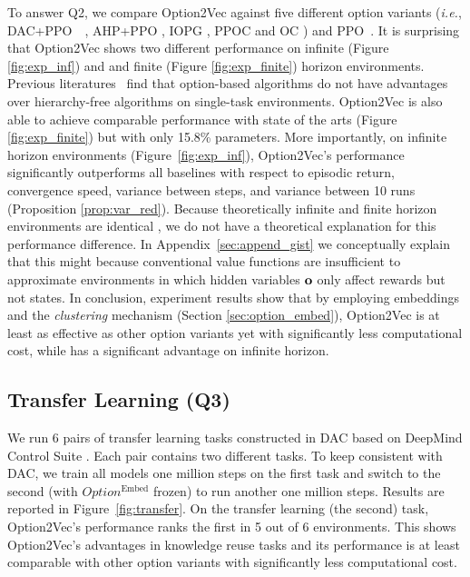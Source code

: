 \documentclass[10pt,journal,compsoc]{IEEEtran}
\renewcommand{\cite}{\citep}
\begin{document}
To answer Q2, we compare Option2Vec against five different option variants (\textit{i.e.}, DAC+PPO~~\cite{zhang2019dac}, AHP+PPO
\cite{levy2011unified}, IOPG \cite{smith2018inference}, PPOC
\cite{klissarov2017learnings} and OC \cite{bacon2017option}) and PPO~\cite{schulman2017proximal}. It is surprising that Option2Vec shows two different
performance on infinite (Figure \ref{fig:exp_inf}) and and finite
(Figure \ref{fig:exp_finite}) horizon environments. Previous
literatures~\cite{klissarov2017learnings,smith2018inference,harb2018waiting,zhang2019dac}
find that option-based algorithms do not have advantages over
hierarchy-free algorithms on single-task environments. Option2Vec
is also able to achieve comparable performance with state of the arts (Figure
\ref{fig:exp_finite}) but with only 15.8\% parameters.
More importantly, on infinite horizon environments
(Figure~\ref{fig:exp_inf}), Option2Vec's performance
significantly outperforms all baselines with respect to episodic
return, convergence speed, variance between steps, and variance
between 10 runs (Proposition \ref{prop:var_red}). Because
theoretically infinite and finite horizon environments are
identical \cite{sutton2018reinforcement}, we do not have a
theoretical explanation for this performance difference. In
Appendix~\ref{sec:append_gist} we conceptually explain that this
might because conventional value functions are insufficient to
approximate environments in which hidden variables ${\mathbf{o}}$ only
affect rewards but not states. In conclusion, experiment
results show that by employing embeddings and the
\emph{clustering} mechanism (Section \ref{sec:option_embed}),
Option2Vec is at least as effective as other option variants yet
with significantly less computational cost, while has a
significant advantage on infinite horizon.

\subsection{Transfer Learning (Q3)}
\label{sec:transfer}
We run 6 pairs of transfer learning tasks constructed in DAC
based on DeepMind Control Suite \cite{tassa2020dmcontrol}. Each
pair contains two different tasks. To keep consistent with DAC,
we train all models one million steps on the first task and
switch to the second (with $Option^{\textrm{Embed}}$ frozen) to run
another one million steps. Results are reported in
Figure~\ref{fig:transfer}. On the transfer learning (the second)
task, Option2Vec's performance ranks the first in 5 out of 6
environments. This shows Option2Vec's advantages in knowledge
reuse tasks and its performance is at least comparable with other
option variants with significantly less computational cost.
\end{document}
